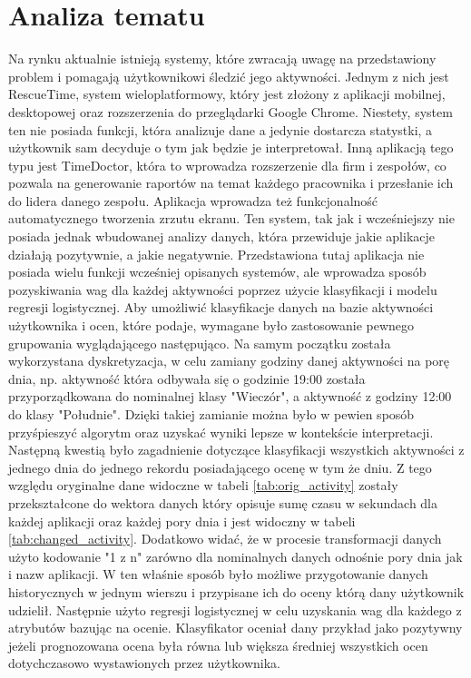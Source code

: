 \documentclass[a4paper,twoside,12pt]{book}
\begin{document}
\chapter{Analiza tematu}
Na rynku aktualnie istnieją systemy, które zwracają uwagę na przedstawiony problem i pomagają użytkownikowi śledzić jego aktywności. Jednym z nich jest RescueTime\cite{rescue_time}, system wieloplatformowy, który jest złożony z aplikacji mobilnej, desktopowej oraz rozszerzenia do przeglądarki Google Chrome. Niestety, system ten nie posiada funkcji, która analizuje dane a jedynie dostarcza statystki, a użytkownik sam decyduje o tym jak będzie je interpretował. Inną aplikacją tego typu jest TimeDoctor\cite{time_doctor}, która to wprowadza rozszerzenie dla firm i zespołów, co pozwala na generowanie raportów na temat każdego pracownika i przesłanie ich do lidera danego zespołu. Aplikacja wprowadza też funkcjonalność automatycznego tworzenia zrzutu ekranu. Ten system, tak jak i wcześniejszy nie posiada jednak wbudowanej analizy danych, która przewiduje jakie aplikacje działają pozytywnie, a jakie negatywnie. Przedstawiona tutaj aplikacja nie posiada wielu funkcji wcześniej opisanych systemów, ale wprowadza sposób pozyskiwania wag dla każdej aktywności poprzez użycie klasyfikacji i modelu regresji logistycznej.  
Aby umożliwić klasyfikacje danych na bazie aktywności użytkownika i ocen, które podaje, wymagane było zastosowanie pewnego grupowania wyglądającego następująco. Na samym początku została wykorzystana dyskretyzacja, w celu zamiany godziny danej aktywności na porę dnia, np. aktywność która odbywała się o godzinie 19:00 została przyporządkowana do nominalnej klasy "Wieczór", a aktywność z godziny 12:00 do klasy "Południe". Dzięki takiej zamianie można było w pewien sposób przyśpieszyć algorytm oraz uzyskać wyniki lepsze w kontekście interpretacji. Następną kwestią było zagadnienie dotyczące klasyfikacji wszystkich aktywności z jednego dnia do jednego rekordu posiadającego ocenę w tym że dniu. Z tego względu oryginalne dane widoczne w tabeli \ref{tab:orig_activity} zostały przekształcone do wektora danych który opisuje sumę czasu w sekundach dla każdej aplikacji oraz każdej pory dnia i jest widoczny w tabeli \ref{tab:changed_activity}. Dodatkowo widać, że w procesie transformacji danych użyto kodowanie "1 z n"\cite{one_hot_encoding} zarówno dla nominalnych danych odnośnie pory dnia jak i nazw aplikacji. W ten właśnie sposób było możliwe przygotowanie danych historycznych w jednym wierszu i przypisane ich do oceny którą dany użytkownik udzielił. Następnie użyto regresji logistycznej w celu uzyskania wag dla każdego z atrybutów bazując na ocenie. Klasyfikator oceniał dany przykład jako pozytywny jeżeli prognozowana ocena była równa lub większa średniej wszystkich ocen dotychczasowo wystawionych przez użytkownika.
\end{document}
